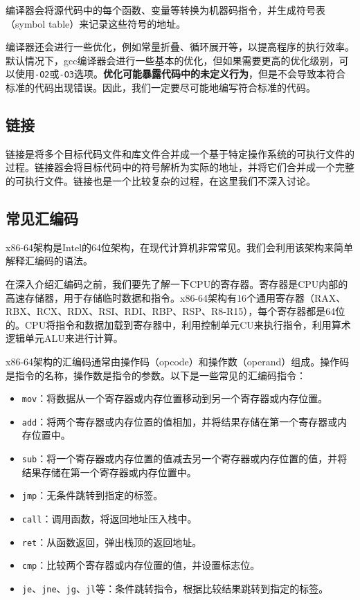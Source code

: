 \documentclass[../main.tex]{subfiles}
\begin{document}
编译器会将源代码中的每个函数、变量等转换为机器码指令，并生成符号表（symbol table）来记录这些符号的地址。

编译器还会进行一些优化，例如常量折叠、循环展开等，以提高程序的执行效率。默认情况下，gcc编译器会进行一些基本的优化，但如果需要更高的优化级别，可以使用\texttt{-O2}或\texttt{-O3}选项。\textbf{优化可能暴露代码中的未定义行为}，但是不会导致本符合标准的代码出现错误。因此，我们一定要尽可能地编写符合标准的代码。

\subsection{链接}
链接是将多个目标代码文件和库文件合并成一个基于特定操作系统的可执行文件的过程。链接器会将目标代码中的符号解析为实际的地址，并将它们合并成一个完整的可执行文件。链接也是一个比较复杂的过程，在这里我们不深入讨论。

\subsection{常见汇编码}

x86-64架构是Intel的64位架构，在现代计算机非常常见。我们会利用该架构来简单解释汇编码的语法。

在深入介绍汇编码之前，我们要先了解一下CPU的寄存器。寄存器是CPU内部的高速存储器，用于存储临时数据和指令。x86-64架构有16个通用寄存器（RAX、RBX、RCX、RDX、RSI、RDI、RBP、RSP、R8-R15），每个寄存器都是64位的。CPU将指令和数据加载到寄存器中，利用控制单元CU来执行指令，利用算术逻辑单元ALU来进行计算。

x86-64架构的汇编码通常由操作码（opcode）和操作数（operand）组成。操作码是指令的名称，操作数是指令的参数。以下是一些常见的汇编码指令：
\begin{itemize}
  \item \texttt{mov}：将数据从一个寄存器或内存位置移动到另一个寄存器或内存位置。
  \item \texttt{add}：将两个寄存器或内存位置的值相加，并将结果存储在第一个寄存器或内存位置中。
  \item \texttt{sub}：将一个寄存器或内存位置的值减去另一个寄存器或内存位置的值，并将结果存储在第一个寄存器或内存位置中。
  \item \texttt{jmp}：无条件跳转到指定的标签。
  \item \texttt{call}：调用函数，将返回地址压入栈中。
  \item \texttt{ret}：从函数返回，弹出栈顶的返回地址。
  \item \texttt{cmp}：比较两个寄存器或内存位置的值，并设置标志位。
  \item \texttt{je}、\texttt{jne}、\texttt{jg}、\texttt{jl}等：条件跳转指令，根据比较结果跳转到指定的标签。
\end{itemize}
\end{document}
